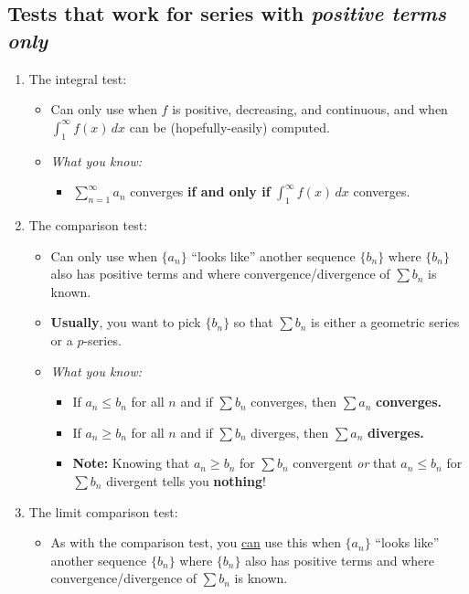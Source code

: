 \documentclass[12pt]{article}
\newcommand{\infsum}[3]{\sum_{{#1}={#2}}^\infty {#3}}
\begin{document}
	\subsection*{Tests that work for series with \textit{positive terms only}}
	\begin{enumerate}
		\item The integral test:
		\begin{itemize}
			\item Can only use when $f$ is positive, decreasing, and continuous, and when $\int_1^\infty f(x)\,dx$ can be (hopefully-easily) computed.
			\item \textit{What you know:} 
			\begin{itemize}
				\item $\infsum{n}{1}{a_n}$ converges \textbf{if and only if} $\int_1^\infty f(x)\,dx$ converges.
			\end{itemize}
		\end{itemize} 
	
		\item The comparison test:
		\begin{itemize}
			\item Can only use when $\{a_n\}$ ``looks like'' another sequence $\{b_n\}$ where $\{b_n\}$ also has positive terms and where convergence/divergence of $\sum b_n$ is known.
			\item \textbf{Usually}, you want to pick $\{b_n\}$ so that $\sum b_n$ is either a geometric series or a $p$-series.
			\item \textit{What you know:} 
			\begin{itemize}
				\item If $a_n\leq b_n$ for all $n$ and if $\sum b_n$ converges, then $\sum a_n$ \textbf{converges.}
				\item If $a_n\geq b_n$ for all $n$ and if $\sum b_n$ diverges, then $\sum a_n$ \textbf{diverges.}
				\item \textbf{Note:} Knowing that $a_n\geq b_n$ for $\sum b_n$ convergent \textit{or} that $a_n\leq b_n$ for $\sum b_n$ divergent tells you \textbf{nothing}!
			\end{itemize}
		\end{itemize} 
	
		\item The limit comparison test:
		\begin{itemize}
			\item As with the comparison test, you \ul{can} use this when $\{a_n\}$ ``looks like'' another sequence $\{b_n\}$ where $\{b_n\}$ also has positive terms and where convergence/divergence of $\sum b_n$ is known.\vspace{3mm}
			

\end{itemize}
\end{enumerate}
\end{document}
